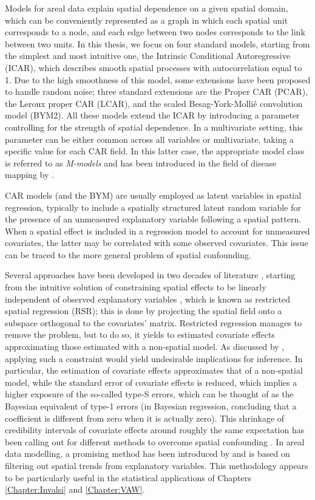 \documentclass[openany, 11pt, oneside]{book}
\begin{document}
Models for areal data explain spatial dependence on a given spatial domain, which can be conveniently represented as a graph in which each spatial unit corresponds to a node, and each edge between two nodes corresponds to the link between two units. In this thesis, we focus on four standard models, starting from the simplest and most intuitive one, the Intrinsic Conditional Autoregressive (ICAR), which describes smooth spatial processes with autocorrelation equal to 1. Due to the high smoothness of this model, some extensions have been proposed to handle random noise; three standard extensions are the Proper CAR (PCAR), the Leroux proper CAR (LCAR), and the scaled Besag-York-Mollié convolution model (BYM2). All these models extend the ICAR by introducing a parameter controlling for the strength of spatial dependence. In a multivariate setting, this parameter can be either common across all variables or multivariate, taking a specific value for each CAR field. In this latter case, the appropriate model class is referred to as \textit{M-models} and has been introduced in the field of disease mapping by \cite{Mmodels}.

CAR models (and the BYM) are usually employed as latent variables in spatial regression, typically to include a spatially structured latent random variable for the presence of an unmeasured explanatory variable following a spatial pattern. When a spatial effect is included in a regression model to account for unmeasured covariates, the latter may be correlated with some observed covariates. This issue can be traced to the more general problem of spatial confounding.

Several approaches have been developed in two decades of literature \parencite{Urdangarin23, DupontArXiv, pim2026spatial}, starting from the intuitive solution of constraining spatial effects to be linearly independent of observed explanatory variables \parencite{RHZ, Hodges}, which is known as restricted spatial regression (RSR); this is done by projecting the spatial field onto a subspace orthogonal to the covariates' matrix. Restricted regression manages to remove the problem, but to do so, it yields to estimated covariate effects approximating those estimated with a non-spatial model. As discussed by \cite{Khan}, applying such a constraint would yield undesirable implications for inference. In particular, the estimation of covariate effects approximates that of a non-spatial model, while the standard error of covariate effects is reduced, which implies a higher exposure of the so-called type-S errors, which can be thought of as the Bayesian equivalent of type-1 errors (in Bayesian regression, concluding that a coefficient is different from zero when it is actually zero). This shrinkage of credibility intervals of covariate effects around roughly the same expectation has been calling out for different methods to overcome spatial confounding \parencite{Urdangarin23}. In areal data modelling, a promising method has been introduced by \parencite{Urdangarin24} and is based on filtering out spatial trends from explanatory variables. This methodology appears to be particularly useful in the statistical applications of Chapters \ref{Chapter:Invalsi} and \ref{Chapter:VAW}.
\end{document}
